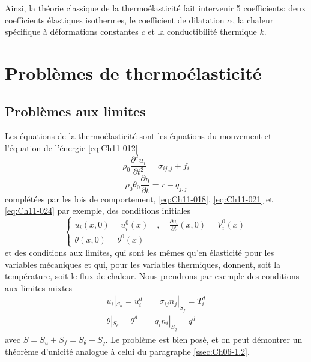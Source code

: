 Ainsi, la théorie classique de la thermoélasticité fait intervenir 5 coefficients: deux coefficients élastiques isothermes, le coefficient de dilatation $\alpha$, la chaleur spécifique à déformations constantes $c$ et la conductibilité thermique $k$.

\section{Problèmes de thermoélasticité}\label{sec:Ch11-2}
\subsection{Problèmes aux limites}\label{ssec:Ch11-2.1}
Les équations de la thermoélasticité sont les équations du mouve­ment et l'équation de l'énergie \eqref{eq:Ch11-012}
\begin{equation}
    \rho_0 \frac{\partial^2 u_i}{\partial t^2} = \sigma_{ij,j}+f_i
    \label{eq:Ch11-026}
\end{equation}
\begin{equation}
    \rho_0 \theta_0 \frac{\partial \eta}{\partial t} = r - q_{j,j}
    \label{eq:Ch11-027}
\end{equation}
complétées par les lois de comportement, \eqref{eq:Ch11-018}, \eqref{eq:Ch11-021} et \eqref{eq:Ch11-024} par exemple, des conditions initiales 
\begin{equation}
 \left\{
  \begin{aligned}
    u_i(x,0) = u_i^0(x) \quad , \quad \frac{\partial u_i}{\partial t}(x,0) = V_i^0(x) \\
    \theta(x,0) = \theta^0(x)
  \end{aligned}
  \right.
    \label{eq:Ch11-028}
\end{equation}
et des conditions aux limites, qui sont les mêmes qu'en élasticité pour les variables mécaniques et qui, pour les variables thermiques, donnent, soit la température, soit le flux de chaleur. Nous prendrons par exemple des conditions aux limites mixtes 
\begin{equation}
  \begin{aligned}
    u_i|_{S_u} = u_i^d \quad\quad  \sigma_{ij}n_j|_{S_f} = T_i^d\\
    \theta|_{S_\theta} = \theta^d \quad\quad  q_in_i|_{S_q} = q^d
  \end{aligned}
    \label{eq:Ch11-029}
\end{equation}
avec $S =S_u+S_f=S_{\theta}+S_q$. Le problème est bien posé, et on peut démontrer un théorème d'unicité analogue à celui du paragraphe \ref{ssec:Ch06-1.2}.
 
